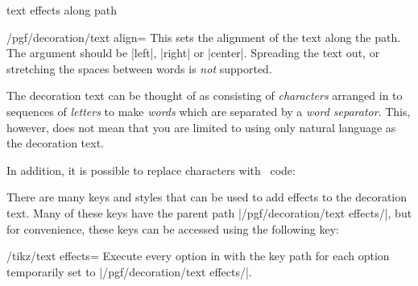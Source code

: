 \begin{decoration}{text effects along path}
    \begin{key}{/pgf/decoration/text align=}
        This sets the alignment of the text along the path. The 
        argument should be |left|, |right| or |center|. Spreading the text out,
        or stretching the spaces between words is \emph{not} supported.
    \end{key}

    The decoration text can be thought of as consisting of \emph{characters}
    arranged in to sequences of \emph{letters} to make \emph{words} which are
    separated by a \emph{word separator}. This, however, does not mean that you
    are limited to using only natural language as the decoration text.
\begin{codeexample}[preamble={\usetikzlibrary{decorations.text}}]
\end{codeexample}

    In addition, it is possible to replace characters with \tikzname\ code:
\begin{codeexample}[preamble={\usetikzlibrary{decorations.text}}]
\end{codeexample}

    There are many keys and styles that can be used to add effects to the
    decoration text. Many of these keys have the parent path
    |/pgf/decoration/text effects/|, but for convenience, these keys can be
    accessed using the following key:

    \begin{key}{/tikz/text effects=}
    Execute every option in  with the key path for each option
    temporarily set to |/pgf/decoration/text effects/|.
    \end{key}


\end{decoration}
